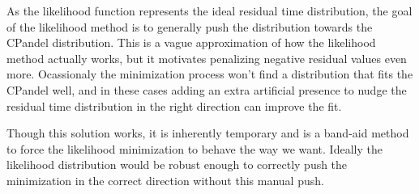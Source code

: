 As the likelihood function represents the ideal residual time distribution, the goal of the likelihood method is to generally push the distribution towards the CPandel distribution. This is a vague approximation of how the likelihood method actually works, but it motivates penalizing negative residual values even more. Ocassionaly the minimization process won't find a distribution that fits the CPandel well, and in these cases adding an extra artificial presence to nudge the residual time distribution in the right direction can improve the fit.

Though this solution works, it is inherently temporary and is a band-aid method to force the likelihood minimization to behave the way we want. Ideally the likelihood distribution would be robust enough to correctly push the minimization in the correct direction without this manual push. 
